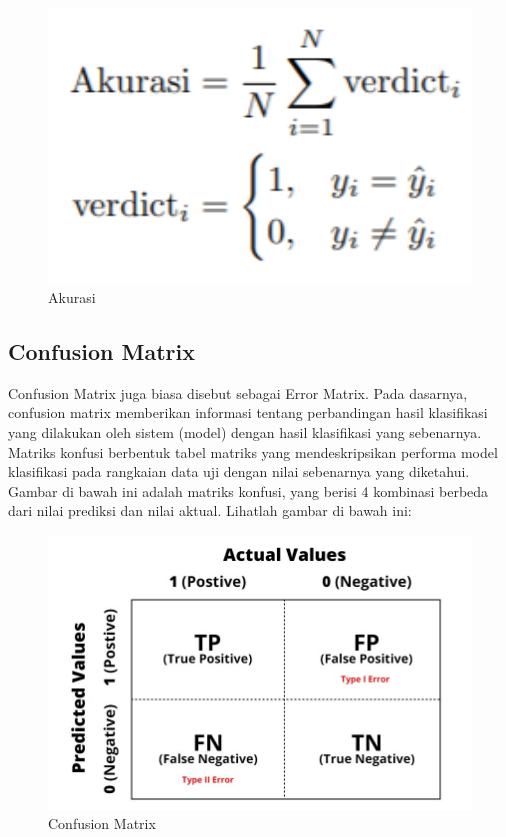 \begin{figure}[H]
    \centering
    \includegraphics[width=12cm]{figures/chapter2/5.PNG}
    \caption{Akurasi}
\end{figure}

\subsection{Confusion Matrix}

\par Confusion Matrix juga biasa disebut sebagai Error Matrix. Pada dasarnya, confusion matrix memberikan informasi tentang perbandingan hasil klasifikasi yang dilakukan oleh sistem (model) dengan hasil klasifikasi yang sebenarnya. Matriks konfusi berbentuk tabel matriks yang mendeskripsikan performa model klasifikasi pada rangkaian data uji dengan nilai sebenarnya yang diketahui. Gambar di bawah ini adalah matriks konfusi, yang berisi 4 kombinasi berbeda dari nilai prediksi dan nilai aktual. Lihatlah gambar di bawah ini:\cite{matrix}

\begin{figure}[H]
    \centering
    \includegraphics[width=12cm]{figures/chapter2/6.jpeg}
    \caption{Confusion Matrix}
\end{figure}

